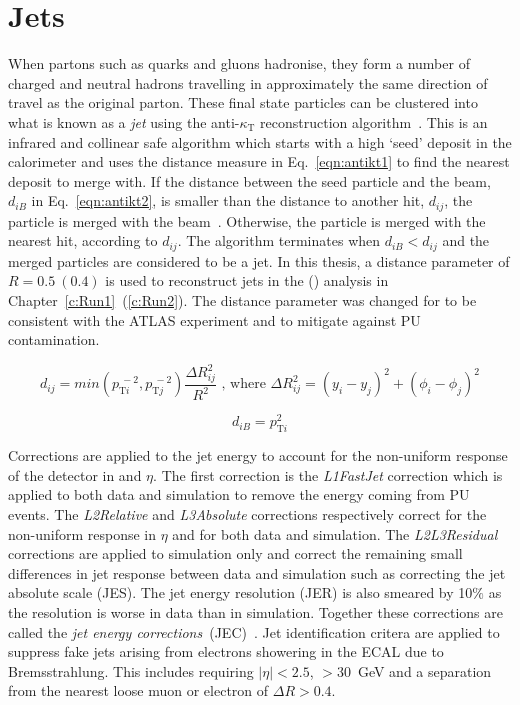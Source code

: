 \section{Jets \label{sec:jetreco}}
When partons such as quarks and gluons hadronise, they form a number of charged and neutral hadrons travelling in approximately the same direction of travel as the original parton. These final state particles can be clustered into what is known as a \emph{jet} using the anti-$\kappa_{\textrm{T}}$ reconstruction algorithm~\cite{Cacciari:2008gp}. This is an infrared and collinear safe algorithm which starts with a high \pt `seed' deposit in the calorimeter and uses the distance measure in Eq.~\ref{eqn:antikt1} to find the nearest deposit to merge with. If the distance between the seed particle and the beam, $d_{iB}$ in Eq.~\ref{eqn:antikt2}, is smaller than the distance to another hit, $d_{ij}$, the particle is merged with the beam~\cite{Salam2010}. Otherwise, the particle is merged with the nearest hit, according to $d_{ij}$. The algorithm terminates when $d_{iB}<d_{ij}$ and the merged particles are considered to be a jet. In this thesis, a distance parameter of $R = 0.5~\left(0.4\right)$ is used to reconstruct jets in the \runone (\runtwo) analysis in Chapter~\ref{c:Run1}~(\ref{c:Run2}). The distance parameter was changed for \runtwo to be consistent with the ATLAS experiment and to mitigate against PU contamination. 


\begin{equation}
d_{ij}=min\left( p_{\textrm{T}i}^{~-2},p_{\textrm{T}j}^{~-2} \right) \frac{\Delta R_{ij}^{2}}{R^{2}} \textrm{ , where } \Delta R_{ij}^{2} = {\left( y_{i} - y_{j}\right)}^{2} +  {\left( {\phi}_{i} - {\phi}_{j}\right)}^{2}
\label{eqn:antikt1}
\end{equation}

\begin{equation}
d_{iB}=p_{\textrm{T}i}^{2}
\label{eqn:antikt2}
\end{equation}

Corrections are applied to the jet energy to account for the non-uniform response of the detector in \pt and $\eta$. The first correction is the \emph{L1FastJet} correction which is applied to both data and simulation to remove the energy coming from PU events. The \emph{L2Relative} and \emph{L3Absolute} corrections respectively correct for the non-uniform response in $\eta$ and \pt for both data and simulation. The \emph{L2L3Residual} corrections are applied to simulation only and correct the remaining small differences in jet response between data and simulation such as correcting the jet absolute scale (JES). The jet energy resolution (JER) is also smeared by 10$\%$ as the resolution is worse in data than in simulation. Together these corrections are called the \emph{jet energy corrections}~(JEC)~\cite{Khachatryan:2016kdb}.
Jet identification critera are applied to suppress fake jets arising from electrons showering in the ECAL due to Bremsstrahlung. This includes requiring $|\eta|<2.5$, \pt$>30$~GeV and a separation from the nearest loose muon or electron of $\Delta R>0.4$.

